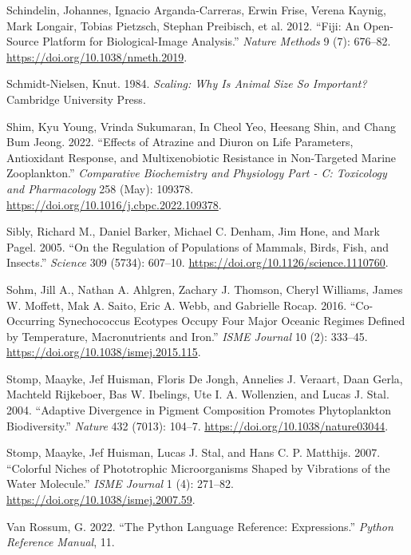 \documentclass[
  letterpaper,
  DIV=11,
  numbers=noendperiod]{scrartcl}
\newlength{\cslhangindent}
\newenvironment{CSLReferences}[2] %
 {\begin{list}{}{%
  \setlength{\itemindent}{0pt}
  \setlength{\leftmargin}{0pt}
  \setlength{\parsep}{0pt}
  \ifodd #1
   \setlength{\leftmargin}{\cslhangindent}
   \setlength{\itemindent}{-1\cslhangindent}
  \fi
  \setlength{\itemsep}{#2\baselineskip}}}
 {\end{list}}
\begin{document}
\begin{CSLReferences}{1}{0}
Schindelin, Johannes, Ignacio Arganda-Carreras, Erwin Frise, Verena
Kaynig, Mark Longair, Tobias Pietzsch, Stephan Preibisch, et al. 2012.
{``Fiji: {An} Open-Source Platform for Biological-Image Analysis.''}
\emph{Nature Methods} 9 (7): 676--82.
\url{https://doi.org/10.1038/nmeth.2019}.

Schmidt-Nielsen, Knut. 1984. \emph{Scaling: {Why} Is {Animal Size So
Important}?} {Cambridge University Press}.

Shim, Kyu Young, Vrinda Sukumaran, In Cheol Yeo, Heesang Shin, and Chang
Bum Jeong. 2022. {``Effects of Atrazine and Diuron on Life Parameters,
Antioxidant Response, and Multixenobiotic Resistance in Non-Targeted
Marine Zooplankton.''} \emph{Comparative Biochemistry and Physiology
Part - C: Toxicology and Pharmacology} 258 (May): 109378.
\url{https://doi.org/10.1016/j.cbpc.2022.109378}.

Sibly, Richard M., Daniel Barker, Michael C. Denham, Jim Hone, and Mark
Pagel. 2005. {``On the {Regulation} of {Populations} of {Mammals},
{Birds}, {Fish}, and {Insects}.''} \emph{Science} 309 (5734): 607--10.
\url{https://doi.org/10.1126/science.1110760}.

Sohm, Jill A., Nathan A. Ahlgren, Zachary J. Thomson, Cheryl Williams,
James W. Moffett, Mak A. Saito, Eric A. Webb, and Gabrielle Rocap. 2016.
{``Co-Occurring {Synechococcus} Ecotypes Occupy Four Major Oceanic
Regimes Defined by Temperature, Macronutrients and Iron.''} \emph{ISME
Journal} 10 (2): 333--45. \url{https://doi.org/10.1038/ismej.2015.115}.

Stomp, Maayke, Jef Huisman, Floris De Jongh, Annelies J. Veraart, Daan
Gerla, Machteld Rijkeboer, Bas W. Ibelings, Ute I. A. Wollenzien, and
Lucas J. Stal. 2004. {``Adaptive Divergence in Pigment Composition
Promotes Phytoplankton Biodiversity.''} \emph{Nature} 432 (7013):
104--7. \url{https://doi.org/10.1038/nature03044}.

Stomp, Maayke, Jef Huisman, Lucas J. Stal, and Hans C. P. Matthijs.
2007. {``Colorful Niches of Phototrophic Microorganisms Shaped by
Vibrations of the Water Molecule.''} \emph{ISME Journal} 1 (4): 271--82.
\url{https://doi.org/10.1038/ismej.2007.59}.

Van Rossum, G. 2022. {``The Python Language Reference: {Expressions}.''}
\emph{Python Reference Manual}, 11.


\end{CSLReferences}
\end{document}
